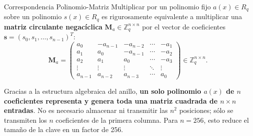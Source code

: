 \documentclass[11pt,a4paper,twoside,openright]{book}
\theoremstyle{plain}
\theoremstyle{definition}
\theoremstyle{remark}
\newcommand{\Zq}{\mathbb{Z}_q}
\newcommand{\Rq}{R_q}
\newcommand{\vv}[1]{\mathbf{#1}}
\newcommand{\mm}[1]{\mathbf{#1}}
\begin{document}
\begin{miteo}{Correspondencia Polinomio-Matriz}
Multiplicar por un polinomio fijo $a(x) \in \Rq$ sobre un polinomio $s(x) \in \Rq$ es rigurosamente equivalente a multiplicar una \textbf{matriz circulante negac\'iclica} $\mm{M}_a \in \Zq^{n \times n}$ por el vector de coeficientes $\vv{s} = (s_0, s_1, \ldots, s_{n-1})^T$:
\[
  \mm{M}_a = \begin{pmatrix}
    a_0 & -a_{n-1} & -a_{n-2} & \cdots & -a_1 \\
    a_1 & a_0 & -a_{n-1} & \cdots & -a_2 \\
    a_2 & a_1 & a_0 & \cdots & -a_3 \\
    \vdots & \vdots & \vdots & \ddots & \vdots \\
    a_{n-1} & a_{n-2} & a_{n-3} & \cdots & a_0
  \end{pmatrix} \in \Zq^{n \times n}.
\]
\end{miteo}

\begin{intuicion}
Gracias a la estructura algebraica del anillo, \textbf{un solo polinomio $a(x)$ de $n$ coeficientes representa y genera toda una matriz cuadrada de $n \times n$ entradas}. No es necesario almacenar ni transmitir las $n^2$ posiciones; s\'olo se transmiten los $n$ coeficientes de la primera columna. Para $n=256$, esto reduce el tama\~no de la clave en un factor de 256.
\end{intuicion}
\end{document}
